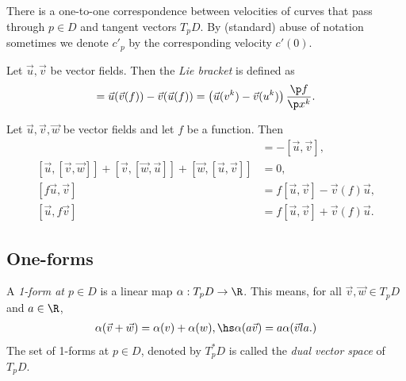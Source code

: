 \documentclass{article}
\begin{document}
\begin{corollary}
    There is a one-to-one correspondence between velocities of curves that pass through 
    $p\in D$ and tangent vectors $T_pD$. By (standard) abuse of notation sometimes 
    we denote $c'_p$ by the corresponding velocity $c'(0)$.
\end{corollary}

\begin{definition}
    Let $\vec u,\vec v$ be vector fields. Then the \emph{Lie bracket} is defined as 
    \begin{align*}
        [\vec u, \vec v] = \vec u(\vec v(f)) - \vec v(\vec u(f)) 
        = \left(\vec u(v^k)-\vec v(u^k)\right)\frac{\p f}{\p x^k}.
    \end{align*}
\end{definition}

\begin{lemma}
    Let $\vec u, \vec v, \vec w$ be vector fields and let $f$ be a
    function. Then 
    \begin{align*}
        [\vec v, \vec u] &= -[\vec u, \vec v],\\
        [\vec u, [\vec v, \vec w]] + [\vec v, [\vec w, \vec u]] + [\vec w, [\vec u, \vec v]] &= 0,\\
        [f\vec u, \vec v] &= f[\vec u,\vec v]-\vec v(f)\vec u,\\
        [\vec u, f\vec v] &= f[\vec u,\vec v]+\vec v(f)\vec u.
    \end{align*}
\end{lemma}

\subsection{One-forms}

\begin{definition}
    A \emph{1-form at $p\in D$} is a linear map $\alpha:T_pD \to \R$. This means, for all
    $\vec v, \vec w\in T_pD$ and $a\in\R$,
    \begin{align*}
        \alpha(\vec v + \vec w) = \alpha(v) + \alpha(w),\hs \alpha(a\vec v) = a\alpha(\vec v    la.)
    \end{align*}
    The set of 1-forms at $p\in D$, denoted by $T^*_p D$ is called the \emph{dual vector space}
    of $T_p D$.
\end{definition}
\end{document}

